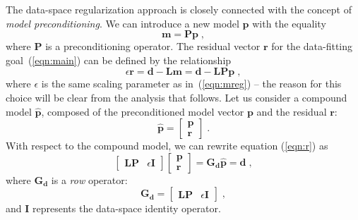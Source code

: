 The data-space regularization approach is closely connected with the
concept of \emph{model preconditioning}.
We can introduce a new model $\mathbf{p}$ with
the equality
\begin{equation}
\mathbf{m = P p}\;,
\label{eqn:prec}
\end{equation}
where $\mathbf{P}$ is a preconditioning operator.
The residual vector $\mathbf{r}$ for the data-fitting
goal~(\ref{eqn:main}) can be defined by the relationship
\begin{equation}
\epsilon \mathbf{r = d - L m = d - L P p}\;,
\label{eqn:r}
\end{equation}
where $\epsilon$ is the same scaling parameter as in~(\ref{eqn:mreg})
-- the reason for this choice will be clear from the analysis that
follows.  Let us consider a compound model $\hat{\mathbf{p}}$, composed
of the preconditioned model vector $\mathbf{p}$ and the residual
$\mathbf{r}$:
\begin{equation}
\label{eqn:hatp}
\hat{\mathbf{p}} = \left[\begin{array}{c} \mathbf{p} \\ \mathbf{r} \end{array}\right]\;.
\end{equation}
With respect to the compound model, we can rewrite equation
(\ref{eqn:r}) as
\begin{equation}
 \left[\begin{array}{cc} \mathbf{L P} & \epsilon \mathbf{I} \end{array}\right]
\left[\begin{array}{c} \mathbf{p} \\ \mathbf{r} \end{array}\right] = 
\mathbf{G_d} \hat{\mathbf{p}} = \mathbf{d}\;,
\label{eqn:main-d}
\end{equation}
where $\mathbf{G_d}$ is a \emph{row} operator:
\begin{equation}
\mathbf{G_d} = \left[\begin{array}{cc} \mathbf{L P} & 
\epsilon \mathbf{I} \end{array}\right]\;,
\label{eqn:gd}
\end{equation}
and $\mathbf{I}$ represents the data-space identity operator.

